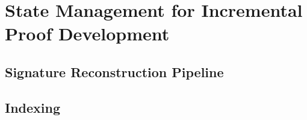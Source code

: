 \chapter{State Management for Incremental Proof Development}


\section{Signature Reconstruction Pipeline}


\section{Indexing}







